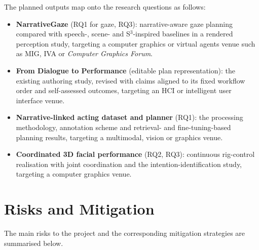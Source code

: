 \documentclass[11pt,a4paper]{article}
\begin{document}
The planned outputs map onto the research questions as follows:
\begin{itemize}
\item \textbf{NarrativeGaze} (RQ1 for gaze, RQ3): narrative-aware gaze planning compared with speech-, scene- and S$^3$-inspired baselines in a rendered perception study, targeting a computer graphics or virtual agents venue such as MIG, IVA or \emph{Computer Graphics Forum}.
\item \textbf{From Dialogue to Performance} (editable plan representation): the existing authoring study, revised with claims aligned to its fixed workflow order and self-assessed outcomes, targeting an HCI or intelligent user interface venue.
\item \textbf{Narrative-linked acting dataset and planner} (RQ1): the processing methodology, annotation scheme and retrieval- and fine-tuning-based planning results, targeting a multimodal, vision or graphics venue.
\item \textbf{Coordinated 3D facial performance} (RQ2, RQ3): continuous rig-control realisation with joint coordination and the intention-identification study, targeting a computer graphics venue.
\end{itemize}

\section{Risks and Mitigation}

The main risks to the project and the corresponding mitigation strategies are summarised below.
\end{document}
